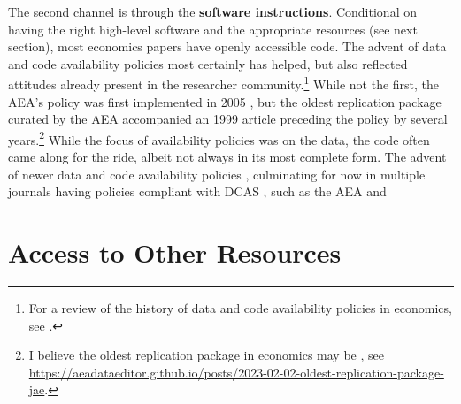 \documentclass{article}
\begin{document}

The second channel is through the \textbf{software instructions}. Conditional on having the right high-level software and the appropriate resources (see next section), most economics papers have openly accessible code. The advent of data and code availability policies most certainly has helped, but also reflected attitudes already present in the researcher community.\footnote{For a review of the history of data and code availability policies in economics, see \citet{vlaeminck_dawning_2021}.} While not the first, the AEA's policy was first implemented in 2005 \citep{bernanke_editorial_2004,american_economic_association_data_2005}, but the oldest replication package curated by the AEA accompanied an 1999 article \citep{frankel_does_1999,frankel_replication_1999} preceding the policy by several years.\footnote{I believe the oldest replication package in economics may be \citet{koenker_asymptotic_1988-1}, see \url{https://aeadataeditor.github.io/posts/2023-02-02-oldest-replication-package-jae}.} While the focus of availability policies was on the data, the code often came along for the ride, albeit not always in its most complete form. The advent of newer data and code availability policies \citep[for the AEA, ][]{AEA-announcement-July-2019,AEA-announcement-July-2019}, culminating for now in multiple journals having policies compliant with \ac{DCAS} \citep{koren_data_2022}, such as the AEA \citep{american_economic_association_data_2024} and




%


\section{Access to Other Resources}
\label{sec:other_resources}
\end{document}
